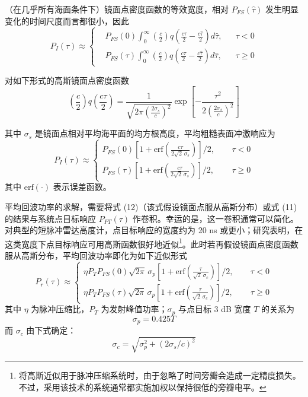 （在几乎所有海面条件下）镜面点密度函数的等效宽度，相对 $P_{FS}(\widehat{\tau})$ 发生明显变化的时间尺度而言都很小，因此
\[
P_{I}(\tau) \approx \left\{
\begin{aligned}
& P_{FS}(0)\int_{0}^{\infty}\left(\frac{c}{2}\right)q\!\left(\frac{c\tau}{2} - \frac{c\widehat{\tau}}{2}\right)d\widehat{\tau}, && \tau < 0 \\
& P_{FS}(\tau)\int_{0}^{\infty}\left(\frac{c}{2}\right)q\!\left(\frac{c\tau}{2} - \frac{c\widehat{\tau}}{2}\right)d\widehat{\tau}, && \tau \geq 0
\end{aligned}
\right.
\]

对如下形式的高斯镜面点密度函数
\[
\left(\frac{c}{2}\right)q\!\left(\frac{c\tau}{2}\right) = \frac{1}{\sqrt{2\pi\left(\frac{2\sigma_{s}}{c}\right)^{2}}}\exp\left[-\frac{\tau^{2}}{2\left(\frac{2\sigma_{s}}{c}\right)^{2}}\right]
\]

其中 $\sigma_{s}$ 是镜面点相对平均海平面的均方根高度，平均粗糙表面冲激响应为
\[
P_{I}(\tau) \approx \left\{
\begin{aligned}
P_{FS}(0)\left[1 + \mathrm{erf}\!\left(\frac{c\tau}{2\sqrt{2}\,\sigma_{s}}\right)\right]/2, \ \ && \tau < 0 \\
P_{FS}(\tau)\left[1 + \mathrm{erf}\!\left(\frac{c\tau}{2\sqrt{2}\,\sigma_{s}}\right)\right]/2, \ \ && \tau \geq 0
\end{aligned}
\right.
\tag{12}
\]
其中 $\mathrm{erf}(\cdot)$ 表示误差函数。

平均回波功率的求解，需要将式 (12)（该式假设镜面点服从高斯分布）或式 (11) 的结果与系统点目标响应 $P_{PT}(\tau)$ 作卷积。幸运的是，这一卷积通常可以简化。对典型的短脉冲雷达高度计，点目标响应的宽度约为 20 ns 或更小；研究表明，在这类宽度下点目标响应可用高斯函数很好地近似\footnote{将高斯近似用于脉冲压缩系统时，由于忽略了时间旁瓣会造成一定精度损失。不过，采用该技术的系统通常都实施加权以保持很低的旁瓣电平。}。此时若再假设镜面点密度函数服从高斯分布，平均回波功率即化为如下近似形式
\[
P_{r}(\tau) \approx \left\{
\begin{aligned}
\eta P_{T}P_{FS}(0)\sqrt{2\pi}\,\sigma_{p}\left[1 + \mathrm{erf}\!\left(\frac{\tau}{\sqrt{2}\,\sigma_{c}}\right)\right]/2, \ \ && \tau < 0 \\
\eta P_{T}P_{FS}(\tau)\sqrt{2\pi}\,\sigma_{p}\left[1 + \mathrm{erf}\!\left(\frac{\tau}{\sqrt{2}\,\sigma_{c}}\right)\right]/2, \ \ && \tau \geq 0
\end{aligned}
\right.
\tag{13}
\]
其中 $\eta$ 为脉冲压缩比，$P_{T}$ 为发射峰值功率；$\sigma_{p}$ 与点目标 3 dB 宽度 $T$ 的关系为
\[
\sigma_{p} = 0.425T
\]
而 $\sigma_{c}$ 由下式确定：
\[
\sigma_{c} = \sqrt{\sigma_{p}^{2} + (2\sigma_{s}/c)^{2}}
\]


